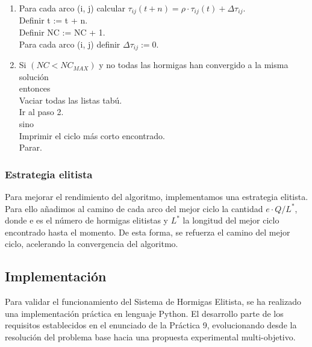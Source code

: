 \begin{enumerate}
    \hspace*{0.25cm} $\Delta \tau_{ij} := \Delta \tau_{ij} + \Delta \tau_{ij}^{k}$

    \item Para cada arco (i, j) calcular $\tau_{ij}(t+n) = \rho \cdot \tau_{ij}(t) + \Delta \tau_{ij}$. \\
    Definir t := t + n. \\
    Definir NC := NC + 1. \\
    Para cada arco (i, j) definir $\Delta \tau_{ij} := 0$. 

    \item Si $(NC < NC_{MAX})$ y no todas las hormigas han convergido a la misma solución \\
    entonces \\
    \hspace*{0.25cm} Vaciar todas las listas tabú. \\
    \hspace*{0.25cm} Ir al paso 2. \\
    sino \\
    \hspace*{0.25cm} Imprimir el ciclo más corto encontrado. \\
    \hspace*{0.25cm} Parar.

\end{enumerate}

\subsubsection{Estrategia elitista}

Para mejorar el rendimiento del algoritmo, implementamos una estrategia elitista. 
Para ello añadimos al camino de cada arco del mejor ciclo la cantidad $e \cdot Q/L^{*}$, donde e es el número de hormigas elitistas y $L^{*}$ la longitud del mejor ciclo encontrado hasta el momento.
De esta forma, se refuerza el camino del mejor ciclo, acelerando la convergencia del algoritmo.
\subsection{Implementación}

Para validar el funcionamiento del Sistema de Hormigas Elitista, se ha realizado una implementación práctica en lenguaje Python. El desarrollo parte de los requisitos establecidos en el enunciado de la Práctica 9, evolucionando desde la resolución del problema base hacia una propuesta experimental multi-objetivo.

